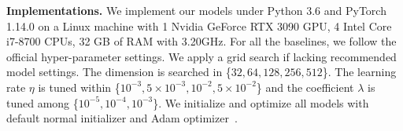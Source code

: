 \vspace{0.05in}

{\textbf{Implementations.}}
We implement our models under Python 3.6 and PyTorch 1.14.0 on a Linux machine with 1 Nvidia GeForce RTX 3090 GPU, 4 Intel Core i7-8700 CPUs, 32 GB of RAM with 3.20GHz.
For all the baselines, we follow the official hyper-parameter settings.
We apply a grid search if lacking recommended model settings.
The dimension is searched in \{$32, 64, 128, 256, 512$\}. 
The learning rate $\eta$ is tuned within \{$10^{-3}, 5\times10^{-3}, 10^{-2}, 5\times10^{-2}$\} and the coefficient $\lambda$ is tuned among \{$10^{-5}, 10^{-4}, 10^{-3}$\}. 
We initialize and optimize all models with default normal initializer and Adam optimizer~\cite{adam}. 

\vspace{0.05in}

